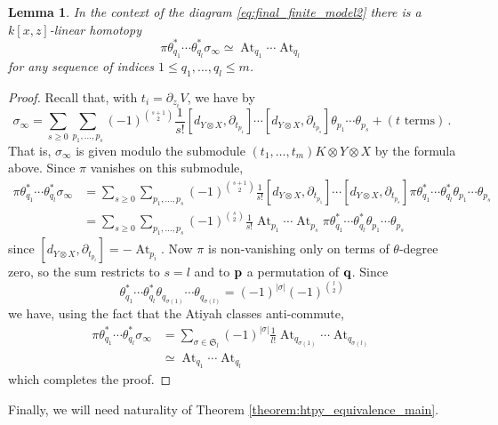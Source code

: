 \documentclass[english,letter paper,12pt,leqno]{article}
\newtheorem{lemma}[theorem]{Lemma}
\theoremstyle{example}
\numberwithin{equation}{section}
\DeclareMathOperator{\At}{At}
\begin{document}
\begin{lemma}\label{lemma:transfercreations} In the context of the diagram \eqref{eq:final_finite_model2} there is a $k[x,z]$-linear homotopy
\[
\pi \theta_{q_1}^* \cdots \theta_{q_l}^* \sigma_\infty \simeq \At_{q_1} \cdots \At_{q_l}
\]
for any sequence of indices $1 \le q_1,\ldots,q_l \le m$.
\end{lemma}
\begin{proof}
Recall that, with $t_i = \partial_{z_i} V$, we have by \cite[Section 10]{dm1102.2957}
\begin{equation}\label{eq:atiyah_formula_sigma}
\sigma_\infty = \sum_{s \ge 0} \sum_{p_1,\ldots,p_s} (-1)^{\binom{s+1}{2}} \frac{1}{s!} [ d_{Y \otimes X}, \partial_{t_{p_1}}] \cdots [ d_{Y \otimes X}, \partial_{t_{p_s}}] \theta_{p_1} \cdots \theta_{p_s} + (t \text{ terms})\,.
\end{equation}
That is, $\sigma_\infty$ is given modulo the submodule $(t_1,\ldots,t_m) K \otimes Y \otimes X$ by the formula above. Since $\pi$ vanishes on this submodule,
\begin{align*}
\pi \theta_{q_1}^* \cdots \theta_{q_l}^* \sigma_\infty &= \sum_{s \ge 0} \sum_{p_1,\ldots,p_s} (-1)^{\binom{s+1}{2}} \frac{1}{s!} [ d_{Y \otimes X}, \partial_{t_{p_1}}] \cdots [ d_{Y \otimes X}, \partial_{t_{p_s}}] \pi \theta_{q_1}^* \cdots \theta_{q_l}^* \theta_{p_1} \cdots \theta_{p_s}\\
&= \sum_{s \ge 0} \sum_{p_1,\ldots,p_s} (-1)^{\binom{s}{2}} \frac{1}{s!} \At_{p_1} \cdots \At_{p_s} \pi \theta_{q_1}^* \cdots \theta_{q_l}^* \theta_{p_1} \cdots \theta_{p_s}
\end{align*}
since $[ d_{Y \otimes X}, \partial_{t_{p_i}}] = - \At_{p_i}$. Now $\pi$ is non-vanishing only on terms of $\theta$-degree zero, so the sum restricts to $s = l$ and to $\bold{p}$ a permutation of $\bold{q}$. Since
\[
\theta_{q_1}^* \cdots \theta_{q_l}^* \theta_{q_{\sigma(1)}} \cdots \theta_{q_{\sigma(l)}} = (-1)^{|\sigma|} (-1)^{\binom{l}{2}}
\]
we have, using the fact that the Atiyah classes anti-commute,
\begin{align*}
\pi \theta_{q_1}^* \cdots \theta_{q_l}^* \sigma_\infty &= \sum_{\sigma \in \mathfrak{S}_l} (-1)^{|\sigma|} \frac{1}{l!} \At_{q_{\sigma(1)}} \cdots \At_{q_{\sigma(l)}}\\
&\simeq \At_{q_1} \cdots \At_{q_l}
\end{align*}
which completes the proof.
\end{proof}

Finally, we will need naturality of Theorem \ref{theorem:htpy_equivalence_main}.
\end{document}
